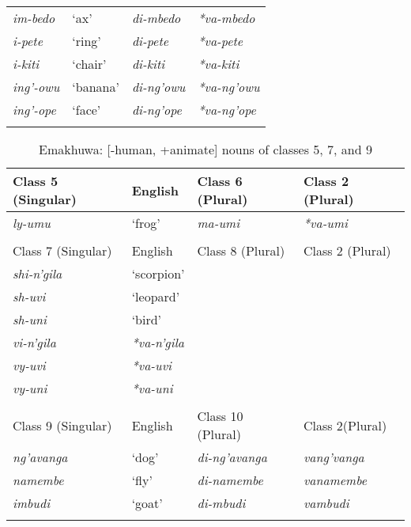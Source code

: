 \documentclass[output=paper]{langsci/langscibook}
\begin{document}
\begin{table}
\begin{tabularx}{\textwidth}{XXXX}
 {\textit{im-bedo}}&   {‘ax’}   & {\textit{di-mbedo}} &  {\textit{*va-mbedo}} \\

 \textit{i-pete}     & ‘ring’   & \textit{di-pete}   &   \textit{*va-pete}   \\

 \textit{i-kiti}     & ‘chair’  & \textit{di-kiti}   &   \textit{*va-kiti}   \\

 \textit{ing’-owu}   & ‘banana’ & \textit{di-ng’owu} &   \textit{*va-ng’owu} \\

 \textit{ing’-ope}   & ‘face’   & \textit{di-ng’ope} &   \textit{*va-ng’ope}\\
 
\lspbottomrule
\end{tabularx}
\end{table}


\begin{table}

\caption{Emakhuwa: [-human, +animate] nouns of classes 5, 7, and 9}
\label{tab:nguna:2}


\begin{tabularx}{\textwidth}{XXXX}
\lsptoprule
 Class 5  (Singular)& English& Class 6  (Plural)& Class 2  (Plural)\\
 \midrule 
 
 \textit{ly-umu}& ‘frog’& \textit{ma-umi}& \textit{*va-umi}\\
 \\
 
 Class 7 (Singular)& English& Class 8 (Plural)& Class 2 (Plural)\\
 \midrule 
 \textit{shi-n’gila}  & ‘scorpion’\\

 \textit{sh-uvi}  & ‘leopard’\\

 \textit{sh-uni}& ‘bird’ \\
 
 \textit{vi-n’gila} & \textit{*va-n’gila}\\

 \textit{vy-uvi} & \textit{*va-uvi}\\

 \textit{vy-uni}& \textit{*va-uni}\\

 \\
{Class 9} {(Singular)} & {English} & {Class 10} {(Plural)} & {Class 2}{(Plural)}\\
\midrule 

 \textit{ng’avanga} & ‘dog’ & \textit{di-ng’avanga} &\textit{vang’vanga}\\

 \textit{namembe} & ‘fly’ & \textit{di-namembe} & \textit{vanamembe} \\

 \textit{imbudi} &‘goat’ & \textit{di-mbudi}&     \textit{vambudi}\\
\lspbottomrule
\end{tabularx}

\end{table}
\end{document}
